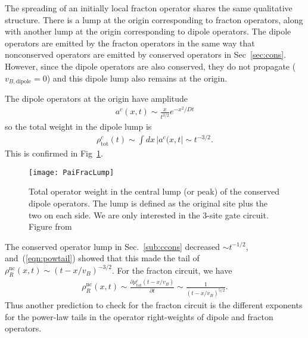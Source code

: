 \documentclass[a4paper,11pt]{article}
\newcommand{\pd}[2]{\frac{\partial #1}{\partial #2}}
\renewcommand{\th}[1]{\frac{1}{#1}}
\newcommand{\abs}[1]{\left| #1 \right|}
\newcommand{\nc}{\text{nc}}
\newcommand{\tot}{\text{tot}}
\begin{document}
The spreading of an initially local fracton operator shares the same qualitative structure. There is a lump at the origin corresponding to fracton operators, along with another lump at the origin corresponding to dipole operators. The dipole operators are emitted by the fracton operators in the same way that nonconserved operators are emitted by conserved operators in Sec~\ref{sec:cons}. However, since the dipole operators are also conserved, they do not propagate ($v_{B, \text{dipole}}=0$) and this dipole lump also remains at the origin.

The dipole operators at the origin have amplitude~\cite{PaiFracton}
\begin{align}
a^c(x,t) \sim \frac{x}{t^{3/2}}e^{-x^2/Dt}
\end{align}
so the total weight in the dipole lump is
\begin{align}
\rho^c_\tot(t) \sim \int dx\,\abs{a^c(x,t} \sim t^{-3/2}. \label{eqn:fraclump}
\end{align}
This is confirmed in Fig~\ref{fig:PaiFracLump}.
\begin{figure}
	\centering
	\texttt{[image: PaiFracLump]}
	\caption{Total operator weight in the central lump (or peak) of the conserved dipole operators. The lump is defined as the original site plus the two on each side. We are only interested in the 3-site gate circuit. Figure from~\cite{PaiFracton}}
	\label{fig:PaiFracLump}
\end{figure}
The conserved operator lump in Sec.~\ref{sub:ccons} decreased $\sim t^{-1/2}$, and~(\ref{eqn:powtail}) showed that this made the tail of $\rho_R^\nc(x,t)\sim (t-x/v_B)^{-3/2}$. For the fracton circuit, we have
\begin{align}
\rho_R^\nc(x,t)\sim\pd{\rho_\tot^c(t-x/v_B)}{t} \sim\th{(t-x/v_B)^{5/2}}. 
\end{align}
Thus another prediction to check for the fracton circuit is the different exponents for the power-law tails in the operator right-weights of dipole and fracton operators.
\end{document}
